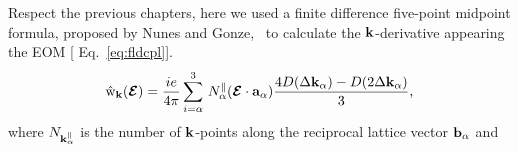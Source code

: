 Respect the previous chapters, here we used a finite difference five-point midpoint formula, proposed by Nunes and Gonze,~\cite{gonze} to calculate the ${\bf k}$-derivative appearing the EOM [ Eq.~\ref{eq:fldcpl}].
\begin{equation}
        \hat{\rm w}_{{\bf k}}(\boldsymbol{\cal E}) = \frac{ie}{4\pi} \sum_{i=\alpha}^3\,N_\alpha^\parallel (\boldsymbol{\cal E} \cdot {\bf a}_\alpha) \frac{ 4 D(\Delta {\bf k}_\alpha) - D( 2 \Delta {\bf k}_\alpha)}{3}, 
\label{eq:wkhat2}
\end{equation}
where $N_{{\bf k}_\alpha^\parallel}$ is the number of ${\bf k}$-points along the reciprocal lattice vector ${\bf b}_\alpha$ and  
